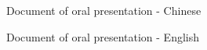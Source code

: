 


\newpage
{}
	{Document of oral presentation - Chinese}

\thispagestyle{empty}




\newpage
{}
	{Document of oral presentation - English}

\thispagestyle{empty}


